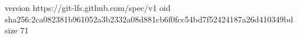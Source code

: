 version https://git-lfs.github.com/spec/v1
oid sha256:2ca082381b961052a3b2332a08d881cb6f0fcc54bd7f52424187a26d410349bd
size 71

